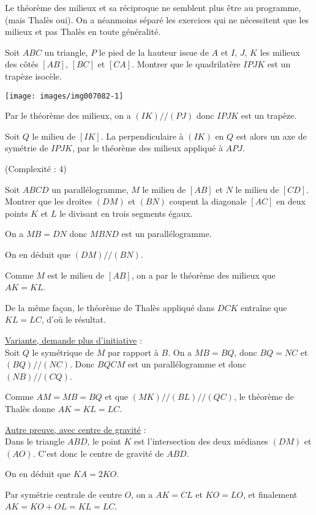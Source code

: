 Le théorème des milieux et sa réciproque ne semblent plus être au programme, (mais Thalès oui). On a néanmoins séparé les exercices qui ne nécessitent que les milieux et pas Thalès en toute généralité.

\begin{exo}[Trapèze isocèle]%
Soit $ABC$ un triangle,  $P$ le pied de la hauteur issue de $A$ et $I$, $J$, $K$  les milieux des côtés $[AB]$, $[BC]$ et $[CA]$. Montrer que le quadrilatère $IPJK$ est un trapèze isocèle.
\begin{center}
\texttt{[image: images/img007082-1]}
\end{center}

\begin{sol}
\end{sol}
Par le théorème des milieux, on a $(IK) // (PJ)$ donc $IPJK$ est un trapèze.

Soit $Q$ le milieu de $[IK]$. La perpendiculaire à $(IK)$ en $Q$ est alors un axe de symétrie de $IPJK$, par le théorème des milieux appliqué à $APJ$.
\end{exo} 

\begin{exo}(Complexité : 4)

Soit $ABCD$ un parallélogramme, $M$ le milieu de $[AB]$ et $N$ le milieu de $[CD]$. Montrer que les droites $(DM)$ et $(BN)$ coupent la diagonale $[AC]$ en deux points $K$ et $L$ le divisant en trois segments égaux.

\begin{sol}
 On a $MB=DN$ donc $MBND$ est un parallélogramme.

 On en déduit que $(DM)//(BN)$.

 Comme $M$ est le milieu de $[AB]$, on a par le théorème des milieux que $AK=KL$.

 De la même façon, le théorème de Thalès appliqué dans $DCK$ entraîne que $KL=LC$, d'où le résultat.

\underline{Variante, demande plus d'initiative} :\\
Soit $Q$ le symétrique de $M$ par rapport à $B$. On a $MB=BQ$, donc $BQ=NC$ et $(BQ)//(NC)$. Donc $BQCM$ est un parallélogramme et donc $(NB)//(CQ)$.

Comme $AM=MB=BQ$ et que $(MK)//(BL)//(QC)$, le théorème de Thalès donne $AK=KL=LC$.

\underline{Autre preuve, avec centre de gravité} :\\
Dans le triangle $ABD$, le point $K$ est l'intersection des deux médianes $(DM)$ et $(AO)$. C'est donc le centre de gravité de $ABD$.

On en déduit que $KA = 2KO$.

Par symétrie centrale de centre $O$, on a $AK=CL$ et $KO=LO$, et finalement $AK = KO+OL = KL = LC$.
\end{sol}
\end{exo}


